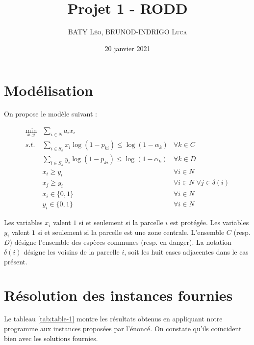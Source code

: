 \documentclass[12pt]{extarticle}
\title{Projet 1 -  RODD}
\date{20 janvier 2021}
\author{\textsc{BATY Léo}, \textsc{BRUNOD-INDRIGO Luca}}
\begin{document}
\maketitle

\section{Modélisation}

On propose le modèle suivant : 

\begin{align*}
    \min_{x, y} &\sum_{i \in N} a_i x_i &\\
    s.t.   & \sum_{i \in S_k} x_i \log(1 - p_{ki}) \leq \log(1 - \alpha_k) & \forall k \in C\\
           & \sum_{i \in S_k} y_i \log(1 - p_{ki}) \leq \log(1 - \alpha_k) & \forall k \in D\\
           & x_i \geq y_i       & \forall i \in N\\
           & x_j \geq y_i       & \forall i \in N \; \forall j \in \delta(i)\\
           & x_i \in \{0, 1\}   & \forall i \in N\\
           & y_i \in \{0, 1\}   & \forall i \in N
\end{align*}

\bigskip

Les variables $x_{i}$ valent $1$ si et seulement si la parcelle $i$ est protégée.
Les variables $y_{i}$ valent $1$ si et seulement si la parcelle est une zone centrale.
L'ensemble $C$ (resp. $D$) désigne l'ensemble des espèces communes (resp. en danger).
La notation $\delta(i)$ désigne les voisins de la parcelle $i$, soit les huit cases adjacentes dans le cas présent.

\section{Résolution des instances fournies}

Le tableau \ref{tab:table-1} montre les résultats obtenus en appliquant notre programme aux instances proposées par l'énoncé.
On constate qu'ils coïncident bien avec les solutions fournies.
\end{document}
